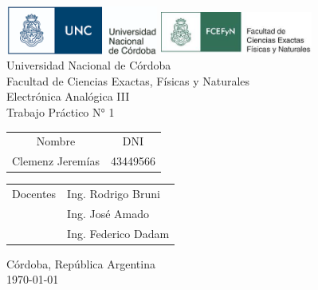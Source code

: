 \begin{titlepage}

    \thispagestyle{empty}
    
    
    \begin{center}
        \includegraphics[width=5cm]{figures/unc_logo.png} \hspace{2cm}
        \includegraphics[width=5cm]{figures/fcefyn_logo.jpg}
        \\[1cm]
        \vspace{5pt}
        \LARGE Universidad Nacional de Córdoba\\[0.5cm] 
        \large Facultad de Ciencias Exactas, Físicas y Naturales \\[0.5cm] 
        \large Electrónica Analógica III
        \\[0.2cm]
        \large Trabajo Práctico N° 1
        \\[0.2cm]
        \vspace{60pt}
        \begin{table}[!h]
        \centering
        \begin{tabular}{ll}
        \multicolumn{1}{c}{Nombre} & \multicolumn{1}{c}{DNI} \\
        Clemenz Jeremías & 43449566 
        \end{tabular}
        \end{table}
        \vspace{20pt}
        \begin{table}[!h]
        \centering
        \begin{tabular}{ll}
        \multicolumn{1}{c}{Docentes} & Ing. Rodrigo Bruni \\
         & Ing. José Amado \\
         & Ing. Federico Dadam
        \end{tabular}
        \end{table}
        \vfill
        Córdoba, República Argentina\\
        \today
    \end{center}
    
    \end{titlepage}